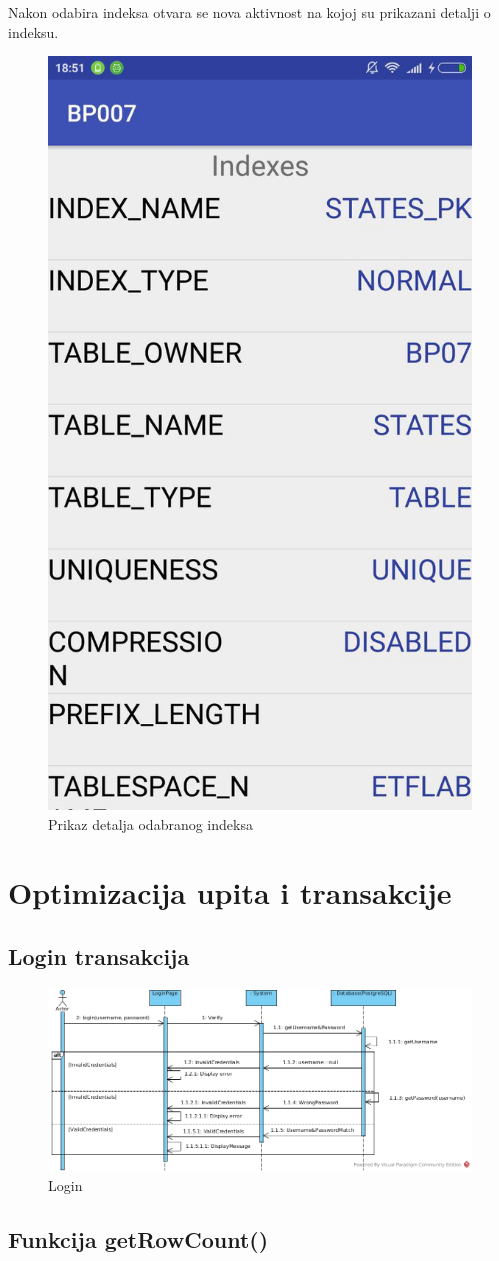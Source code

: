 \documentclass[12pt, a4paper]{report}
\theoremstyle{definition}
\begin{document}
Nakon odabira indeksa otvara se nova aktivnost na kojoj su prikazani detalji o indeksu.
\begin{figure}[H]
	\begin{center} 
		\includegraphics[height=0.5\textwidth]{m.jpg}
	\end{center}
	\caption{Prikaz detalja odabranog indeksa}
\end{figure}

\chapter{Optimizacija upita i transakcije}

\section{Login transakcija}

\begin{figure}[H]
	\begin{center} 
		\includegraphics[height=0.5\textwidth]{LoginDiagram.jpg}
	\end{center}
	\caption{Login}
\end{figure}

\section{Funkcija getRowCount()}
\end{document}
